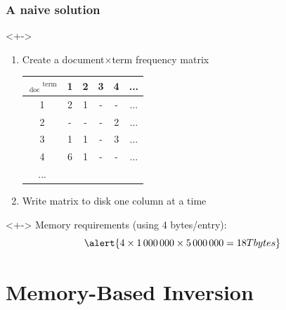 \documentclass[svgnames]{beamer}
\begin{document}
\begin{frame}
    \frametitle{A naive solution}

    \begin{block}{}<+->
        \begin{enumerate}
        \item Create a document$\times$term frequency matrix
            \vspace{1ex}
            \begin{center}
                \begin{tabular}{c|ccccc}
                    $~_\text{doc}~^\text{term}$ & 1 & 2 & 3 & 4 & ... \\\hline
                    1 & 2 & 1 & - & - & ... \\
                    2 & - & - & - & 2 & ... \\
                    3 & 1 & 1 & - & 3 & ... \\
                    4 & 6 & 1 & - & - & ... \\
                    ...
                \end{tabular}
            \end{center}
            \vspace{1ex}
        \item Write matrix to disk one column at a time
        \end{enumerate}
    \end{block}

    \begin{exampleblock}{}<+->
        Memory requirements (using 4 bytes/entry):
        \begin{displaymath}
            \alert{4 \times 1\,000\,000 \times 5\,000\,000 = 18 Tbytes}
        \end{displaymath}
    \end{exampleblock}

\end{frame}


\section{Memory-Based Inversion}
\end{document}
